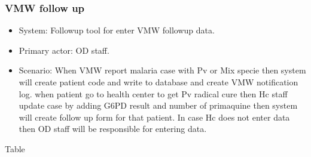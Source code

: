 \documentclass[letterpaper,10pt,english,openany,oneside]{sphinxmanual}
\begin{document}
\subsubsection{VMW follow up}
\label{\detokenize{module/module:vmw-follow-up}}\begin{itemize}
\item {} 
\sphinxAtStartPar
System: Followup tool for enter VMW followup data.

\item {} 
\sphinxAtStartPar
Primary actor: OD staff.

\item {} 
\sphinxAtStartPar
Scenario: When VMW report malaria case with Pv or Mix specie then system will create patient code and write to database and create VMW notification log.
when patient go to health center to get Pv radical cure then Hc staff update case by adding G6PD result and number of primaquine then system will create follow up form for that patient.
In case Hc does not enter data then OD staff will be responsible for entering data.

\end{itemize}

\sphinxAtStartPar
Table
\end{document}
